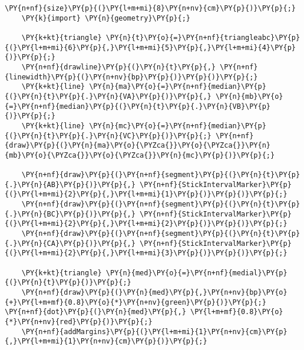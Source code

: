 \begin{Verbatim}[commandchars=\\\{\}]
    \PY{n+nf}{size}\PY{p}{(}\PY{l+m+mi}{8}\PY{n+nv}{cm}\PY{p}{)}\PY{p}{;}
    \PY{k}{import} \PY{n}{geometry}\PY{p}{;}

    \PY{k+kt}{triangle} \PY{n}{t}\PY{o}{=}\PY{n+nf}{triangleabc}\PY{p}{(}\PY{l+m+mi}{6}\PY{p}{,}\PY{l+m+mi}{5}\PY{p}{,}\PY{l+m+mi}{4}\PY{p}{)}\PY{p}{;}
    \PY{n+nf}{drawline}\PY{p}{(}\PY{n}{t}\PY{p}{,} \PY{n+nf}{linewidth}\PY{p}{(}\PY{n+nv}{bp}\PY{p}{)}\PY{p}{)}\PY{p}{;}
    \PY{k+kt}{line} \PY{n}{ma}\PY{o}{=}\PY{n+nf}{median}\PY{p}{(}\PY{n}{t}\PY{p}{.}\PY{n}{VA}\PY{p}{)}\PY{p}{,} \PY{n}{mb}\PY{o}{=}\PY{n+nf}{median}\PY{p}{(}\PY{n}{t}\PY{p}{.}\PY{n}{VB}\PY{p}{)}\PY{p}{;}
    \PY{k+kt}{line} \PY{n}{mc}\PY{o}{=}\PY{n+nf}{median}\PY{p}{(}\PY{n}{t}\PY{p}{.}\PY{n}{VC}\PY{p}{)}\PY{p}{;} \PY{n+nf}{draw}\PY{p}{(}\PY{n}{ma}\PY{o}{\PYZca{}}\PY{o}{\PYZca{}}\PY{n}{mb}\PY{o}{\PYZca{}}\PY{o}{\PYZca{}}\PY{n}{mc}\PY{p}{)}\PY{p}{;}

    \PY{n+nf}{draw}\PY{p}{(}\PY{n+nf}{segment}\PY{p}{(}\PY{n}{t}\PY{p}{.}\PY{n}{AB}\PY{p}{)}\PY{p}{,} \PY{n+nf}{StickIntervalMarker}\PY{p}{(}\PY{l+m+mi}{2}\PY{p}{,}\PY{l+m+mi}{1}\PY{p}{)}\PY{p}{)}\PY{p}{;}
    \PY{n+nf}{draw}\PY{p}{(}\PY{n+nf}{segment}\PY{p}{(}\PY{n}{t}\PY{p}{.}\PY{n}{BC}\PY{p}{)}\PY{p}{,} \PY{n+nf}{StickIntervalMarker}\PY{p}{(}\PY{l+m+mi}{2}\PY{p}{,}\PY{l+m+mi}{2}\PY{p}{)}\PY{p}{)}\PY{p}{;}
    \PY{n+nf}{draw}\PY{p}{(}\PY{n+nf}{segment}\PY{p}{(}\PY{n}{t}\PY{p}{.}\PY{n}{CA}\PY{p}{)}\PY{p}{,} \PY{n+nf}{StickIntervalMarker}\PY{p}{(}\PY{l+m+mi}{2}\PY{p}{,}\PY{l+m+mi}{3}\PY{p}{)}\PY{p}{)}\PY{p}{;}

    \PY{k+kt}{triangle} \PY{n}{med}\PY{o}{=}\PY{n+nf}{medial}\PY{p}{(}\PY{n}{t}\PY{p}{)}\PY{p}{;}
    \PY{n+nf}{draw}\PY{p}{(}\PY{n}{med}\PY{p}{,}\PY{n+nv}{bp}\PY{o}{+}\PY{l+m+mf}{0.8}\PY{o}{*}\PY{n+nv}{green}\PY{p}{)}\PY{p}{;} \PY{n+nf}{dot}\PY{p}{(}\PY{n}{med}\PY{p}{,} \PY{l+m+mf}{0.8}\PY{o}{*}\PY{n+nv}{red}\PY{p}{)}\PY{p}{;}
    \PY{n+nf}{addMargins}\PY{p}{(}\PY{l+m+mi}{1}\PY{n+nv}{cm}\PY{p}{,}\PY{l+m+mi}{1}\PY{n+nv}{cm}\PY{p}{)}\PY{p}{;}
\end{Verbatim}
